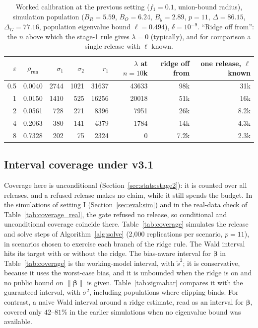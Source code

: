 \documentclass[11pt]{article}
\theoremstyle{definition}
\theoremstyle{plain}
\newcommand{\bbeta}{\boldsymbol{\beta}}
\begin{document}
\begin{table}[ht]
  \centering\small
  \caption{Worked calibration at the previous setting ($f_1 = 0.1$, union-bound radius), simulation population ($B_R = 5.59$, $B_O = 6.24$, $B_y = 2.89$, $p = 11$, $\Delta = 86.15$, $\Delta_G = 77.16$, population eigenvalue bound $\ell = 0.494$), $\delta = 10^{-9}$. ``Ridge off from'': the $n$ above which the stage-1 rule gives $\lambda = 0$ (typically), and for comparison a single release with $\ell$ known.}
  \label{tab:calib_example}
  \begin{tabular}{@{}rcrrrrrr@{}}
    \toprule
    $\varepsilon$ & $\rho_{\mathrm{run}}$ & $\sigma_1$ & $\sigma_2$ & $r_1$ & $\lambda$ at $n = 10$k & ridge off from & one release, $\ell$ known \\
    \midrule
    0.5 & 0.0040 & 2744 & 1021 & 31637 & 43633 & 98k & 31k \\
    1 & 0.0150 & 1410 & 525 & 16256 & 20018 & 51k & 16k \\
    2 & 0.0561 & 728 & 271 & 8396 & 7951 & 26k & 8.2k \\
    4 & 0.2063 & 380 & 141 & 4379 & 1784 & 14k & 4.3k \\
    8 & 0.7328 & 202 & 75 & 2324 & 0 & 7.2k & 2.3k \\
    \bottomrule
  \end{tabular}
\end{table}

\subsection{Interval coverage under v3.1}
\label{sec:eval:coverage}

Coverage here is unconditional (Section~\ref{sec:stats:stage2}): it is counted over all releases, and a refused release makes no claim, while it still spends the budget. In the simulations of setting I (Section~\ref{sec:eval:sim}) and in the real-data check of Table~\ref{tab:coverage_real}, the gate refused no release, so conditional and unconditional coverage coincide there. Table~\ref{tab:coverage} simulates the release and solve steps of Algorithm~\ref{alg:solve} (2{,}000 replications per scenario, $p = 11$), in scenarios chosen to exercise each branch of the ridge rule. The Wald interval hits its target with or without the ridge. The bias-aware interval for $\bbeta$ in Table~\ref{tab:coverage} is the working-model interval, with $\tilde s^2$; it is conservative, because it uses the worst-case bias, and it is unbounded when the ridge is on and no public bound on $\|\bbeta\|$ is given. Table~\ref{tab:sigmabar} compares it with the guaranteed interval, with $\bar\sigma^2$, including populations where clipping binds. For contrast, a naive Wald interval around a ridge estimate, read as an interval for $\bbeta$, covered only $42$--$81\%$ in the earlier simulations when no eigenvalue bound was available.
\end{document}
